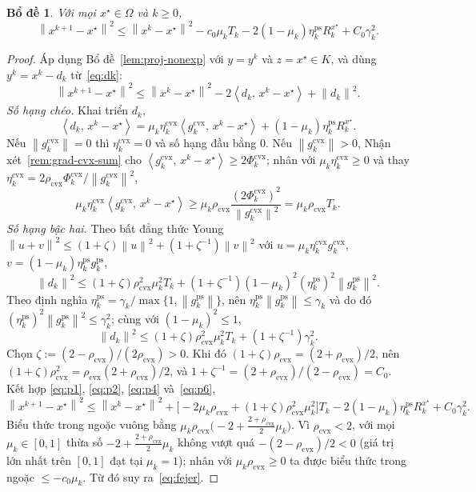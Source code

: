 \documentclass[]{interact}
\theoremstyle{plain}
\newtheorem{lemma}[theorem]{Bổ đề}
\theoremstyle{definition}
\theoremstyle{remark}
\newcommand{\norm}[1]{\left\lVert #1 \right\rVert}
\newcommand{\inner}[2]{\left\langle #1,\, #2 \right\rangle}
\newcommand{\cvx}{\mathrm{cvx}}
\newcommand{\ps}{\mathrm{ps}}
\begin{document}
\begin{lemma}\label{lem:fejer}
Với mọi $x^\star\in\Omega$ và $k\ge 0$,
\begin{equation}\label{eq:fejer}
\norm{x^{k+1}-x^\star}^2\le\norm{x^k-x^\star}^2-c_0\mu_k T_k-2(1-\mu_k)\eta^{\ps}_k R^{x^\star}_k+C_0\gamma_k^2 .
\end{equation}
\end{lemma}
\begin{proof}
Áp dụng Bổ đề~\ref{lem:proj-nonexp} với $y=y^k$ và $z=x^\star\in K$, và dùng
$y^k=x^k-d_k$ từ~\eqref{eq:dk}:
\begin{equation}\label{eq:p1}
\norm{x^{k+1}-x^\star}^2\le\norm{x^k-x^\star}^2-2\inner{d_k}{x^k-x^\star}+\norm{d_k}^2 .
\end{equation}
\emph{Số hạng chéo.} Khai triển $d_k$,
\begin{equation}\label{eq:p2}
\inner{d_k}{x^k-x^\star}=\mu_k\eta^{\cvx}_k\inner{g^{\cvx}_k}{x^k-x^\star}+(1-\mu_k)\eta^{\ps}_k R^{x^\star}_k .
\end{equation}
Nếu $\norm{g^{\cvx}_k}=0$ thì $\eta^{\cvx}_k=0$ và số hạng đầu bằng $0$. Nếu
$\norm{g^{\cvx}_k}>0$, Nhận xét~\ref{rem:grad-cvx-sum} cho
$\inner{g^{\cvx}_k}{x^k-x^\star}\ge 2\Phi^{\cvx}_k$; nhân với
$\mu_k\eta^{\cvx}_k\ge 0$ và thay
$\eta^{\cvx}_k=2\rho_{\cvx}\Phi^{\cvx}_k/\norm{g^{\cvx}_k}^2$,
\begin{equation}\label{eq:p4}
\mu_k\eta^{\cvx}_k\inner{g^{\cvx}_k}{x^k-x^\star}\ge\mu_k\rho_{\cvx}\frac{(2\Phi^{\cvx}_k)^2}{\norm{g^{\cvx}_k}^2}=\mu_k\rho_{\cvx}T_k .
\end{equation}
\emph{Số hạng bậc hai.} Theo bất đẳng thức Young
$\norm{u+v}^2\le(1+\zeta)\norm{u}^2+(1+\zeta^{-1})\norm{v}^2$ với
$u=\mu_k\eta^{\cvx}_k g^{\cvx}_k$, $v=(1-\mu_k)\eta^{\ps}_k g^{\ps}_k$,
\[
\norm{d_k}^2\le(1+\zeta)\rho_{\cvx}^2\mu_k^2 T_k+(1+\zeta^{-1})(1-\mu_k)^2(\eta^{\ps}_k)^2\norm{g^{\ps}_k}^2 .
\]
Theo định nghĩa $\eta^{\ps}_k=\gamma_k/\max\{1,\norm{g^{\ps}_k}\}$, nên
$\eta^{\ps}_k\norm{g^{\ps}_k}\le\gamma_k$ và do đó
$(\eta^{\ps}_k)^2\norm{g^{\ps}_k}^2\le\gamma_k^2$; cùng với $(1-\mu_k)^2\le 1$,
\begin{equation}\label{eq:p6}
\norm{d_k}^2\le(1+\zeta)\rho_{\cvx}^2\mu_k^2 T_k+(1+\zeta^{-1})\gamma_k^2 .
\end{equation}
Chọn $\zeta:=(2-\rho_{\cvx})/(2\rho_{\cvx})>0$. Khi đó
$(1+\zeta)\rho_{\cvx}=(2+\rho_{\cvx})/2$, nên
$(1+\zeta)\rho_{\cvx}^2=\rho_{\cvx}(2+\rho_{\cvx})/2$, và
$1+\zeta^{-1}=(2+\rho_{\cvx})/(2-\rho_{\cvx})=C_0$. Kết hợp
\eqref{eq:p1}, \eqref{eq:p2}, \eqref{eq:p4} và~\eqref{eq:p6},
\[
\norm{x^{k+1}-x^\star}^2\le\norm{x^k-x^\star}^2+\bigl[-2\mu_k\rho_{\cvx}+(1+\zeta)\rho_{\cvx}^2\mu_k^2\bigr]T_k-2(1-\mu_k)\eta^{\ps}_k R^{x^\star}_k+C_0\gamma_k^2 .
\]
Biểu thức trong ngoặc vuông bằng
$\mu_k\rho_{\cvx}\bigl(-2+\tfrac{2+\rho_{\cvx}}{2}\mu_k\bigr)$. Vì $\rho_{\cvx}<2$, với
mọi $\mu_k\in[0,1]$ thừa số $-2+\tfrac{2+\rho_{\cvx}}{2}\mu_k$ không vượt quá
$-(2-\rho_{\cvx})/2<0$ (giá trị lớn nhất trên $[0,1]$ đạt tại $\mu_k=1$); nhân với
$\mu_k\rho_{\cvx}\ge0$ ta được biểu thức trong ngoặc $\le -c_0\mu_k$. Từ đó suy ra~\eqref{eq:fejer}.
\end{proof}
\end{document}
